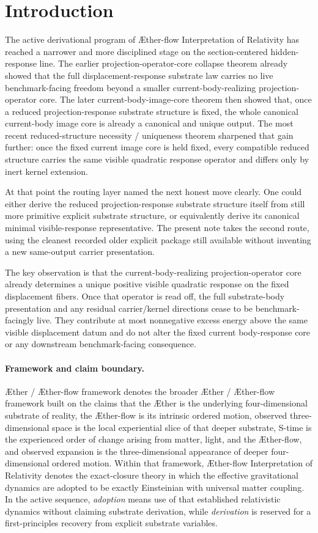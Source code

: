 \documentclass[11pt]{article}
\newcommand{\Aether}{\AE{}ther}
\newcommand{\Aflow}{\AE{}ther-flow}
\newcommand{\TheoryName}{\Aflow{} Interpretation of Relativity}
\newcommand{\TheoryProgram}{\Aether{} / \Aflow{} framework}
\begin{document}
\section{Introduction}

The active derivational program of \TheoryName{} has reached a narrower and more disciplined stage on the section-centered hidden-response line. The earlier projection-operator-core collapse theorem already showed that the full displacement-response substrate law carries no live benchmark-facing freedom beyond a smaller current-body-realizing projection-operator core. The later current-body-image-core theorem then showed that, once a reduced projection-response substrate structure is fixed, the whole canonical current-body image core is already a canonical and unique output. The most recent reduced-structure necessity / uniqueness theorem sharpened that gain further: once the fixed current image core is held fixed, every compatible reduced structure carries the same visible quadratic response operator and differs only by inert kernel extension.

At that point the routing layer named the next honest move clearly. One could either derive the reduced projection-response substrate structure itself from still more primitive explicit substrate structure, or equivalently derive its canonical minimal visible-response representative. The present note takes the second route, using the cleanest recorded older explicit package still available without inventing a new same-output carrier presentation.

The key observation is that the current-body-realizing projection-operator core already determines a unique positive visible quadratic response on the fixed displacement fibers. Once that operator is read off, the full substrate-body presentation and any residual carrier/kernel directions cease to be benchmark-facingly live. They contribute at most nonnegative excess energy above the same visible displacement datum and do not alter the fixed current body-response core or any downstream benchmark-facing consequence.

\paragraph{Framework and claim boundary.}
\TheoryProgram{} denotes the broader \Aether{} / \Aflow{} framework built on the claims that the \Aether{} is the underlying four-dimensional substrate of reality, the \Aflow{} is its intrinsic ordered motion, observed three-dimensional space is the local experiential slice of that deeper substrate, S-time is the experienced order of change arising from matter, light, and the \Aflow{}, and observed expansion is the three-dimensional appearance of deeper four-dimensional ordered motion. Within that framework, \TheoryName{} denotes the exact-closure theory in which the effective gravitational dynamics are adopted to be exactly Einsteinian with universal matter coupling. In the active sequence, \emph{adoption} means use of that established relativistic dynamics without claiming substrate derivation, while \emph{derivation} is reserved for a first-principles recovery from explicit substrate variables.
\end{document}
